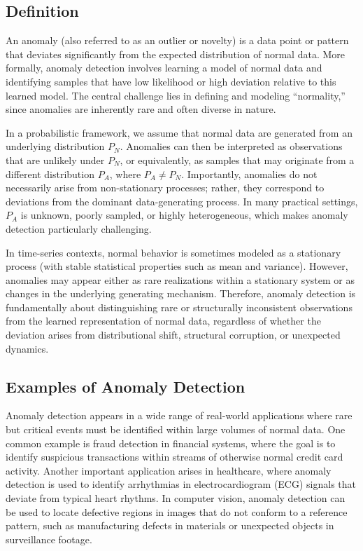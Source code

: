 \documentclass{article}
\begin{document}
\subsection{Definition}

An anomaly (also referred to as an outlier or novelty) is a data point or pattern that deviates significantly from the expected distribution of normal data. More formally, anomaly detection involves learning a model of normal data and identifying samples that have low likelihood or high deviation relative to this learned model. The central challenge lies in defining and modeling “normality,” since anomalies are inherently rare and often diverse in nature.

In a probabilistic framework, we assume that normal data are generated from an underlying distribution $P_N$. Anomalies can then be interpreted as observations that are unlikely under $P_N$, or equivalently, as samples that may originate from a different distribution $P_A$, where $P_A \neq P_N$. Importantly, anomalies do not necessarily arise from non-stationary processes; rather, they correspond to deviations from the dominant data-generating process. In many practical settings, $P_A$ is unknown, poorly sampled, or highly heterogeneous, which makes anomaly detection particularly challenging.

In time-series contexts, normal behavior is sometimes modeled as a stationary process (with stable statistical properties such as mean and variance). However, anomalies may appear either as rare realizations within a stationary system or as changes in the underlying generating mechanism. Therefore, anomaly detection is fundamentally about distinguishing rare or structurally inconsistent observations from the learned representation of normal data, regardless of whether the deviation arises from distributional shift, structural corruption, or unexpected dynamics.

\subsection{Examples of Anomaly Detection}

Anomaly detection appears in a wide range of real-world applications where rare but critical events must be identified within large volumes of normal data. One common example is fraud detection in financial systems, where the goal is to identify suspicious transactions within streams of otherwise normal credit card activity. Another important application arises in healthcare, where anomaly detection is used to identify arrhythmias in electrocardiogram (ECG) signals that deviate from typical heart rhythms. In computer vision, anomaly detection can be used to locate defective regions in images that do not conform to a reference pattern, such as manufacturing defects in materials or unexpected objects in surveillance footage.
\end{document}
